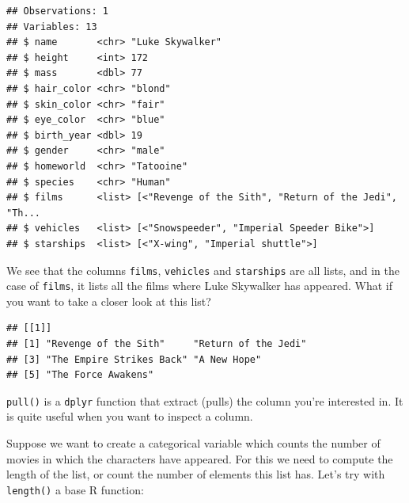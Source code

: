 \documentclass[]{gitbook}
\newenvironment{Shaded}{\begin{snugshade}}{\end{snugshade}}
\newcommand{\KeywordTok}[1]{\textcolor[rgb]{0.13,0.29,0.53}{\textbf{#1}}}
\newcommand{\NormalTok}[1]{#1}
\newcommand{\OperatorTok}[1]{\textcolor[rgb]{0.81,0.36,0.00}{\textbf{#1}}}
\newcommand{\StringTok}[1]{\textcolor[rgb]{0.31,0.60,0.02}{#1}}
\theoremstyle{definition}
\theoremstyle{definition}
\theoremstyle{definition}
\theoremstyle{remark}
\begin{document}
\begin{verbatim}
## Observations: 1
## Variables: 13
## $ name       <chr> "Luke Skywalker"
## $ height     <int> 172
## $ mass       <dbl> 77
## $ hair_color <chr> "blond"
## $ skin_color <chr> "fair"
## $ eye_color  <chr> "blue"
## $ birth_year <dbl> 19
## $ gender     <chr> "male"
## $ homeworld  <chr> "Tatooine"
## $ species    <chr> "Human"
## $ films      <list> [<"Revenge of the Sith", "Return of the Jedi", "Th...
## $ vehicles   <list> [<"Snowspeeder", "Imperial Speeder Bike">]
## $ starships  <list> [<"X-wing", "Imperial shuttle">]
\end{verbatim}

We see that the columns \texttt{films}, \texttt{vehicles} and
\texttt{starships} are all lists, and in the case of \texttt{films}, it
lists all the films where Luke Skywalker has appeared. What if you want
to take a closer look at this list?

\begin{Shaded}
\end{Shaded}

\begin{verbatim}
## [[1]]
## [1] "Revenge of the Sith"     "Return of the Jedi"     
## [3] "The Empire Strikes Back" "A New Hope"             
## [5] "The Force Awakens"
\end{verbatim}

\texttt{pull()} is a \texttt{dplyr} function that extract (pulls) the
column you're interested in. It is quite useful when you want to inspect
a column.

Suppose we want to create a categorical variable which counts the number
of movies in which the characters have appeared. For this we need to
compute the length of the list, or count the number of elements this
list has. Let's try with \texttt{length()} a base R function:

\begin{Shaded}
\end{Shaded}
\end{document}
